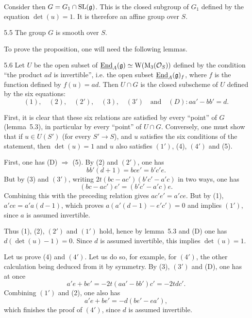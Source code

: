  Consider then $G=G_1\cap\operatorname{SL}(\mathfrak g)$. This is the closed subgroup of $G_1$ defined by the equation $\det(u)=1$. It is therefore an affine group over $S$.

\begin{proposition}{5.5}\label{XIX.5.5}
The group $G$ is smooth over $S$.
\end{proposition}
To prove the proposition, one will need the following lemmas.

\begin{lemma}{5.6}\label{XIX.5.6}
Let $U$ be the open subset of $\underline{\operatorname{End}}_A(\mathfrak g)\simeq\mathrm W(\mathrm M_3(\mathcal{O}_S))$ defined by the condition ``the product $ad$ is invertible'', i.e. the open subset $\underline{\operatorname{End}}_A(\mathfrak g)_f$, where $f$ is the function defined by $f(u)=ad$. Then $U\cap G$ is the closed subscheme of $U$ defined by the six equations:
\[
(1),\quad(2),\quad(2'),\quad(3),\quad(3')\quad\text{and}\quad(D):aa'-bb'=d.
\]
\end{lemma}
First, it is clear that these six relations are satisfied by every ``point'' of $G$ (lemma~5.3), in particular by every ``point'' of $U\cap G$. Conversely, one must show that if $u\in U(S')$ (for every $S'\to S$), and $u$ satisfies the six conditions of the statement, then $\det(u)=1$ and $u$ also satisfies $(1')$, (4), $(4')$ and (5).

First, one has (D) $\Rightarrow$ (5). By (2) and $(2')$, one has
\[
bb'(d+1)=bce'=b'c'e.
\]
But by (3) and $(3')$, writing $2t(bc-ac')(b'c'-a'c)$ in two ways, one has
\[
(bc-ac')e'=(b'c'-a'c)e.
\]
Combining this with the preceding relation gives $ac'e'=a'ce$. But by (1), $a'ce=a'a(d-1)$, which proves $a(a'(d-1)-e'c')=0$ and implies $(1')$, since $a$ is assumed invertible.

Thus (1), (2), $(2')$ and $(1')$ hold, hence by lemma~5.3 and (D) one has $d(\det(u)-1)=0$. Since $d$ is assumed invertible, this implies $\det(u)=1$.

Let us prove (4) and $(4')$. Let us do so, for example, for $(4')$, the other calculation being deduced from it by symmetry. By (3), $(3')$ and (D), one has at once
\[
a'e+be'=-2t(aa'-bb')c'=-2tdc'.
\]
Combining $(1')$ and (2), one also has{\renewcommand{\thefootnote}{(39)}}
\[
a'e+be'=-d(be'-ea'),
\]
which finishes the proof of $(4')$, since $d$ is assumed invertible.

